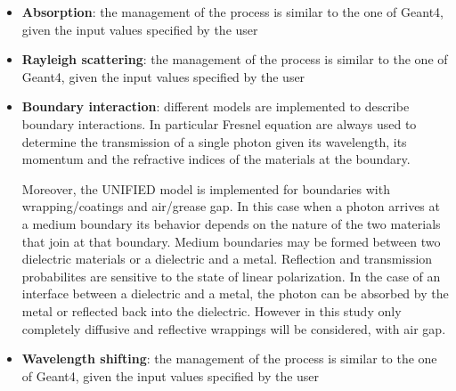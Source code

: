 \begin{itemize}
\item \textbf{Absorption}: the management of the process is similar to the one of Geant4, given the input values specified by the user
\item \textbf{Rayleigh scattering}: the management of the process is similar to the one of Geant4, given the input values specified by the user
\item \textbf{Boundary interaction}: different models are implemented to describe boundary interactions. In particular Fresnel equation are always used to determine the transmission of a single photon given its wavelength, its momentum and the refractive indices of the materials at the boundary.

Moreover, the UNIFIED model is implemented for boundaries with wrapping/coatings and air/grease gap.
In this case when a photon arrives at a medium boundary its behavior depends on the nature of the two materials that join at that boundary. Medium boundaries may be formed between two dielectric materials or a dielectric and a metal. Reflection and transmission probabilites are sensitive to the state of linear polarization. In the case of an interface between a dielectric and a metal, the photon can be absorbed by the metal or reflected back into the dielectric.
However in this study only completely diffusive and reflective wrappings will be considered, with air gap.
\item \textbf{Wavelength shifting}: the management of the process is similar to the one of Geant4, given the input values specified by the user
\end{itemize}

